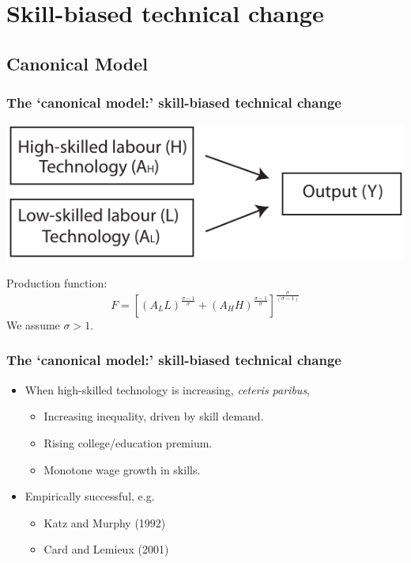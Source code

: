 \documentclass[red]{beamer}
\begin{document}
\section{Skill-biased technical change}
\subsection{Canonical Model}
\begin{frame}[c]
\frametitle{The `canonical model:' skill-biased technical change}
\begin{center}
  \includegraphics[width=\textwidth]{slides_fig/CES.pdf}
\end{center}
Production function:
\begin{equation*}
  \label{eq:cobbdoug}
  F = \left[\left(A_LL\right)^{\frac{\sigma - 1}{\sigma}}
            + \left(A_HH\right)^{\frac{\sigma - 1}{\sigma}}
          \right]^\frac{\sigma}{(\sigma-1)}
\end{equation*}
We assume $\sigma>1$.
\end{frame}

\begin{frame}
\frametitle{The `canonical model:' skill-biased technical change}
\begin{itemize}
\item When high-skilled technology is increasing, {\em ceteris paribus},
  \begin{itemize}
  \item Increasing inequality, driven by skill demand.
  \item Rising college/education premium.
  \item Monotone wage growth in skills.
  \end{itemize}
\vspace{1cm}
\item Empirically successful, e.g.
  \begin{itemize}
  \item Katz and Murphy (1992)
  \item Card and Lemieux (2001)
  \end{itemize}
\end{itemize}
\end{frame}
\end{document}
